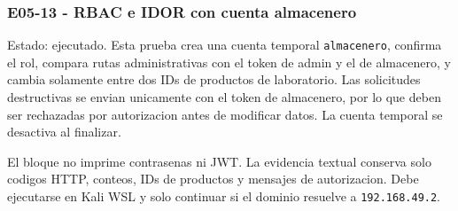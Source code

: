\subsubsection{E05-13 - RBAC e IDOR con cuenta almacenero}\label{e05-13---rbac-e-idor-con-cuenta-almacenero}

Estado: ejecutado. Esta prueba crea una cuenta temporal \texttt{almacenero}, confirma el rol, compara rutas administrativas con el token de admin y el de almacenero, y cambia solamente entre dos IDs de productos de laboratorio. Las solicitudes destructivas se envian unicamente con el token de almacenero, por lo que deben ser rechazadas por autorizacion antes de modificar datos. La cuenta temporal se desactiva al finalizar.

El bloque no imprime contrasenas ni JWT. La evidencia textual conserva solo codigos HTTP, conteos, IDs de productos y mensajes de autorizacion. Debe ejecutarse en Kali WSL y solo continuar si el dominio resuelve a \texttt{192.168.49.2}.

